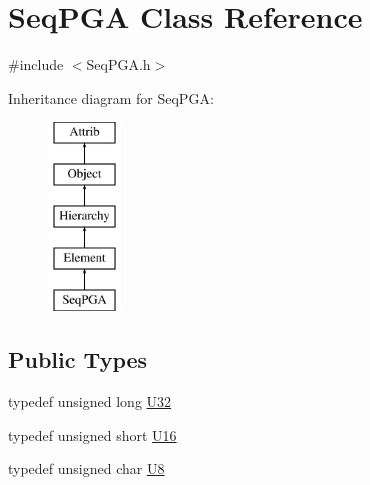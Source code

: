 \hypertarget{classSeqPGA}{}\section{Seq\+P\+GA Class Reference}
\label{classSeqPGA}


{\ttfamily \#include $<$Seq\+P\+G\+A.\+h$>$}

Inheritance diagram for Seq\+P\+GA\+:\begin{figure}[H]
\begin{center}
\leavevmode
\includegraphics[height=5.000000cm]{classSeqPGA}
\end{center}
\end{figure}
\subsection*{Public Types}
\begin{DoxyCompactItemize}
\item 
typedef unsigned long \hyperlink{classSeqPGA_a9e9a99e1d7586223a7c118a19deef42c}{U32}
\item 
typedef unsigned short \hyperlink{classSeqPGA_ab58f68f9484bdc99722a29f533f0d4e3}{U16}
\item 
typedef unsigned char \hyperlink{classSeqPGA_ace27b11f060e537a6fd756cc3eca5347}{U8}
\end{DoxyCompactItemize}
